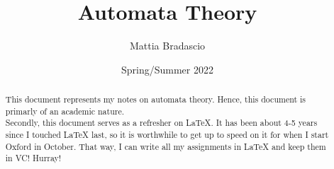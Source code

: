 \documentclass[12pt, letterpaper]{article}
\title{Automata Theory}
\author{Mattia Bradascio}
\date{Spring/Summer 2022}
\begin{document}
\begin{titlepage}
\maketitle
\end{titlepage}

\begin{abstract}

    This document represents my notes on automata theory.
    Hence, this document is primarly of an academic nature. \\ 
    \indent Secondly, this document serves as a refresher on LaTeX. 
    It has been about 4-5 years since I touched LaTeX last,
    so it is worthwhile to get up to speed on it for when I start Oxford in October.
    That way, I can write all my assignments in LaTeX and keep them in VC! Hurray!

\end{abstract}
\end{document}
